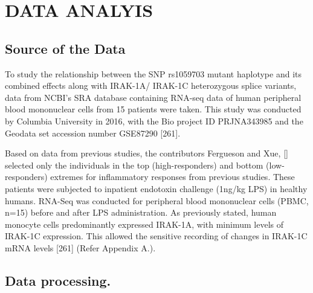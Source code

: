 

\chapter{DATA ANALYIS}

\section{Source of the Data }
\label{source-of-the-data}


To study the relationship between the SNP rs1059703 mutant haplotype and
its combined effects along with IRAK-1A/ IRAK-1C heterozygous splice
variants, data from NCBI's SRA database containing RNA-seq data of human
peripheral blood mononuclear cells from 15 patients were taken. This
study was conducted by Columbia University in 2016, with the Bio project
ID PRJNA343985 and the Geodata set accession number GSE87290 {[}261{]}.\cite{1}

Based on data from previous studies, the contributors Fergueson and Xue,
{[}{]} selected only the individuals in the top (high-responders) and
bottom (low-responders) extremes for inflammatory responses from
previous studies. These patients were subjected to inpatient endotoxin
challenge (1ng/kg LPS) in healthy humans. RNA-Seq was conducted for
peripheral blood mononuclear cells (PBMC, n=15) before and after LPS
administration. As previously stated, human monocyte cells predominantly
expressed IRAK-1A, with minimum levels of IRAK-1C expression. This
allowed the sensitive recording of changes in IRAK-1C mRNA levels
{[}261{]} (Refer Appendix A.).

\section{ Data processing.}\label{data-processing.}

